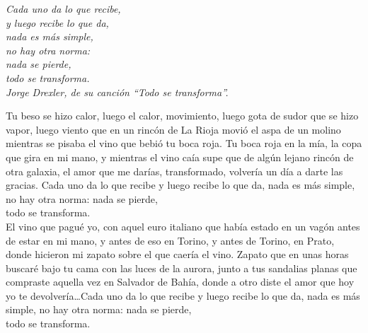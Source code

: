 
%
%
%

\thispagestyle{empty}
\vspace*{3.5cm}
\begin{flushright}

\emph{Cada uno da lo que recibe,\\y luego recibe lo que da,\\nada es m{\'a}s simple,\\no hay otra norma:\\nada se pierde,\\todo se transforma.}\\
\vspace*{0.5cm} \emph{Jorge Drexler, de su canci{\'o}n ``Todo se
transforma''.}

\vfill

\tiny{Tu beso se hizo calor, luego el calor, movimiento, luego gota
de sudor que se hizo vapor, luego viento que en un rinc{\'o}n de La
Rioja movi{\'o} el aspa de un molino mientras se pisaba el vino que
bebi{\'o} tu boca roja. Tu boca roja en la m{\'i}a, la copa que gira
en mi mano, y mientras el vino ca{\'i}a supe que de alg{\'u}n lejano
rinc{\'o}n de otra galaxia, el amor que me dar{\'i}as, transformado,
volver{\'i}a un d{\'i}a a darte las gracias. Cada uno da lo que
recibe y luego recibe lo que da, nada es m{\'a}s simple, no hay otra
norma: nada se pierde, \\ todo se transforma. \\ El vino que
pagu{\'e} yo, con aquel euro italiano que hab{\'i}a estado en un
vag{\'o}n antes de estar en mi mano, y antes de eso en Torino, y
antes de Torino, en Prato, donde hicieron mi zapato sobre el que
caer{\'i}a el vino. Zapato que en unas horas buscar{\'e} bajo tu
cama con las luces de la aurora, junto a tus sandalias planas que
compraste aquella vez en Salvador de Bah{\'i}a, donde a otro diste
el amor que hoy yo te devolver{\'i}a\dots Cada uno da lo que recibe
y luego recibe lo que
da, nada es m{\'a}s simple, no hay otra norma: nada se pierde, \\
todo se transforma.}


\end{flushright}
